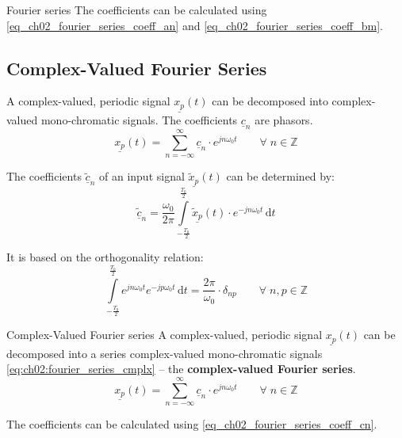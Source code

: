\begin{refsection}
\begin{definition}{Fourier series}
	The coefficients can be calculated using \eqref{eq_ch02_fourier_series_coeff_an} and \eqref{eq_ch02_fourier_series_coeff_bm}.
\end{definition}

\subsection{Complex-Valued Fourier Series}

A complex-valued, periodic signal $\underline{x_p}(t)$ can be decomposed into complex-valued mono-chromatic signals. The coefficients $\underline{c}_n$ are phasors.
\begin{equation}
	\underline{x_p}(t) = \sum\limits_{n = -\infty}^{\infty} \underline{c}_n \cdot e^{j n \omega_0 t} \qquad \forall \; n \in \mathbb{Z}
	\label{eq:ch02:fourier_series_cmplx}
\end{equation}

The coefficients $\underline{\tilde{c}}_n$ of an input signal $\underline{\tilde{x}_p}(t)$ can be determined by:
\begin{equation}
	\underline{\tilde{c}}_n = \frac{\omega_0}{2 \pi} \int\limits_{-\frac{T_0}{2}}^{\frac{T_0}{2}} \underline{\tilde{x}_p}(t) \cdot e^{-j n \omega_0 t} \, \mathrm{d} t
	\label{eq_ch02_fourier_series_coeff_cn}
\end{equation}

It is based on the orthogonality relation:
\begin{equation}
	\int\limits_{-\frac{T_0}{2}}^{\frac{T_0}{2}} e^{j n \omega_0 t} e^{-j p \omega_0 t} \, \mathrm{d} t = \frac{2 \pi}{\omega_0} \cdot \delta_{np} \qquad \forall \; n, p \in \mathbb{Z}
	\label{eq:ch02:orth_rel_exp}
\end{equation}

\begin{definition}{Complex-Valued Fourier series}
	A complex-valued, periodic signal $\underline{x_p}(t)$ can be decomposed into a series complex-valued mono-chromatic signals \eqref{eq:ch02:fourier_series_cmplx} -- the  \textbf{complex-valued Fourier series}.
	\begin{equation*}
		\underline{x_p}(t) = \sum\limits_{n = -\infty}^{\infty} \underline{c}_n \cdot e^{j n \omega_0 t} \qquad \forall \; n \in \mathbb{Z}
	\end{equation*}
	
	The coefficients can be calculated using \eqref{eq_ch02_fourier_series_coeff_cn}.
\end{definition}


\end{refsection}
